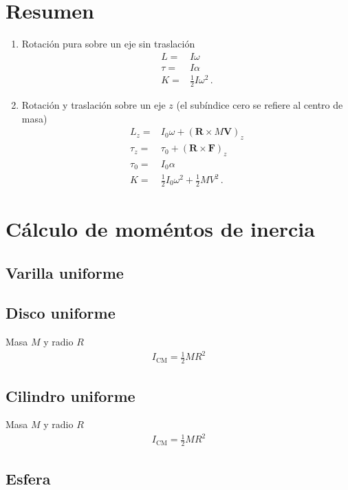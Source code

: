 \section{Resumen}
\begin{enumerate}
\item Rotación pura sobre un eje sin traslación
  \begin{align}
    L=&I\omega\nonumber\\
    \tau=&I\alpha\nonumber\\
    K=&\tfrac{1}{2}I\omega^2\,.
  \end{align}
\item Rotación y traslación sobre un eje $z$ (el subíndice cero se refiere al centro de masa)
  \begin{align}
    L_z=&I_0\omega+(\mathbf{R}\times M\mathbf{V})_z\nonumber\\
    \tau_z=&\tau_0+(\mathbf{R}\times\mathbf{F})_z\nonumber\\
    \tau_0=&I_0\alpha\nonumber\\
    K=&\tfrac{1}{2}I_0\omega^2+\tfrac{1}{2}M V^2\,.
  \end{align}


\end{enumerate}


\section{Cálculo de moméntos de inercia}

\subsection{Varilla uniforme}

\subsection{Disco uniforme}
Masa $M$ y radio $R$
\begin{align}
  I_{\text{CM}}=\frac{1}{2}MR^2
\end{align}
\subsection{Cilindro uniforme}
Masa $M$ y radio $R$
\begin{align}
  I_{\text{CM}}=\frac{1}{2}MR^2
\end{align}

\subsection{Esfera}


